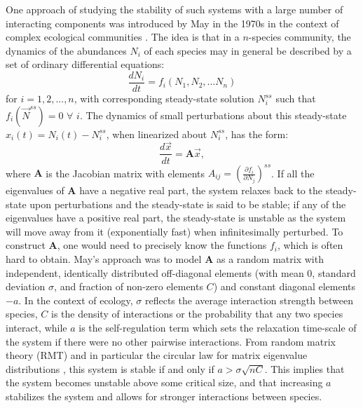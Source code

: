 \documentclass[10pt]{article}
\begin{document}
One approach of studying the stability of such systems with a large number of interacting components was introduced by May in the 1970s in the context of complex ecological communities \cite{may1972will}. The idea is that in a $n$-species community, the dynamics of the abundances $N_i$ of each species may in general be described by a set of ordinary differential equations:
\begin{equation}
    \frac{dN_i}{dt} = f_i(N_1,N_2,...N_n) 
    \label{eqn:dNidt}
\end{equation}
 for $i=1,2,...,n$, with corresponding steady-state solution ${N_i^{ss}}$ such that $f_i({\vec{N}^{ss}})=0$ $\forall$ $i$. The dynamics of small perturbations about this steady-state $x_i(t) = N_i(t)-N_i^{ss}$, when linearized about $N_i^{ss}$, has the form:
 \begin{equation}
     \frac{d\vec{x}}{dt} = \textbf{A} \vec{x},
 \end{equation}
 where $\textbf{A}$ is the Jacobian matrix with elements $A_{ij} = \left(\frac{\partial f_i}{\partial N_j} \right)^{ss}$. If all the eigenvalues of $\textbf{A}$ have a negative real part, the system relaxes back to the steady-state upon perturbations and the steady-state is said to be stable; if any of the eigenvalues have a positive real part, the steady-state is unstable as the system will move away from it (exponentially fast) when infinitesimally perturbed. To construct $\textbf{A}$, one would need to precisely know the functions $f_i$, which is often hard to obtain. May's approach was to model $\textbf{A}$ as a random matrix with independent, identically distributed off-diagonal elements (with mean $0$, standard deviation $\sigma$, and fraction of non-zero elements $C$) and constant diagonal elements $-a$. In the context of ecology, $\sigma$ reflects the average interaction strength between species, $C$ is the density of interactions or the probability that any two species interact, while $a$ is the self-regulation term which sets the relaxation time-scale of the system if there were no other pairwise interactions. From random matrix theory (RMT) and in particular the circular law for matrix eigenvalue distributions \cite{ginibre1965statistical, girko1985circular}, this system is stable if and only if $a > \sigma \sqrt{nC}$. This implies that the system becomes unstable above some critical size, and that increasing $a$ stabilizes the system and allows for stronger interactions between species. 
\end{document}
